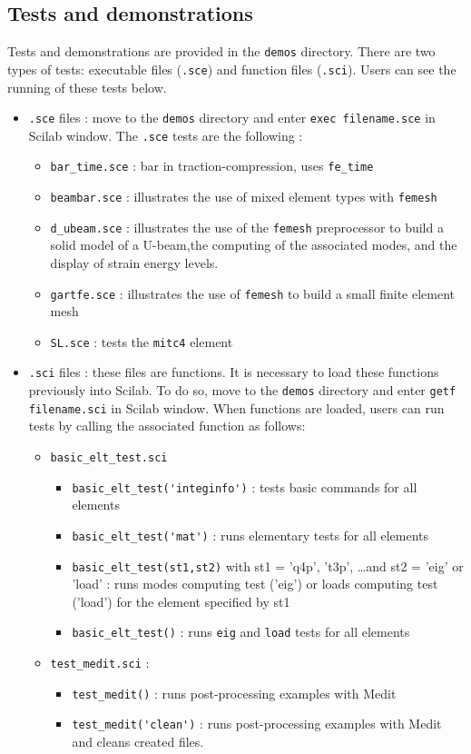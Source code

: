 \subsection{Tests and demonstrations}
Tests and demonstrations are provided in the \verb+demos+ directory. There are two types of tests: executable files (\verb+.sce+) and function files (\verb+.sci+). Users can see the running of these tests below.
\begin{itemize}
\item \verb+.sce+ files : move to the \verb+demos+ directory and enter \verb+exec filename.sce+ in Scilab window. The \verb+.sce+ tests are the following :
\begin{itemize}
\item \verb+bar_time.sce+ : bar in traction-compression, uses \verb+fe_time+
\item \verb+beambar.sce+ : illustrates the use of mixed element types with \verb+femesh+
\item \verb+d_ubeam.sce+ : illustrates the use of the \verb+femesh+ preprocessor to build a solid model of a U-beam,the computing of the associated modes, and the display of strain energy levels.
\item \verb+gartfe.sce+ : illustrates the use of \verb+femesh+ to build a small finite element mesh
\item \verb+SL.sce+ : tests the \verb+mitc4+ element
\end{itemize}

\item \verb+.sci+ files : these files are functions. It is necessary to load these functions previously into Scilab. To do so, move to the \verb+demos+ directory and enter \verb+getf filename.sci+ in Scilab window. When functions are loaded, users can run tests by calling the associated function as follows:
\begin{itemize}
\item \verb+basic_elt_test.sci+
\begin{itemize}
\item \verb+basic_elt_test('integinfo')+ : tests basic commands for all elements
\item \verb+basic_elt_test('mat')+ : runs elementary tests for all elements
\item \verb+basic_elt_test(st1,st2)+ with st1 = 'q4p', 't3p', \ldots and st2 = 'eig' or 'load' : runs modes computing test ('eig') or loads computing test ('load') for the element specified by st1
\item \verb+basic_elt_test()+ : runs \verb+eig+ and \verb+load+ tests for all elements 
\end{itemize}
\item \verb+test_medit.sci+ :
\begin{itemize}
\item \verb+test_medit()+ : runs post-processing examples with Medit
\item \verb+test_medit('clean')+ : runs post-processing examples with Medit and cleans created files.
\end{itemize}
\end{itemize}

\end{itemize}

